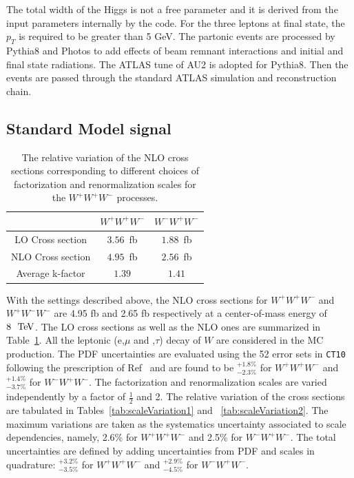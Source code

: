 The total width of the Higgs is not a free parameter and it is
derived from the input parameters internally by the code.  For the
three leptons at final state, the $p_T$ is required to be greater than
5 GeV. The partonic events are processed by {\sc
  Pythia8}\cite{Sjostrand:2007gs} and {\sc
  Photos}\cite{Golonka:2005pn} to add effects of beam remnant
interactions and initial and final state radiations. The ATLAS tune of
AU2\cite{ATLAS:2011zja} is adopted for {\sc Pythia8}.  Then the events
are passed through the standard ATLAS simulation and reconstruction
chain.
\subsection{Standard Model signal}

\begin{table}[ht!]
    \centering
\begin{tabular}{c|c|c}
\hline
     			  & $W^+W^+W^-$ & $W^-W^+W^-$ \\
\hline
LO Cross section  & $3.56$~fb   & $1.88$~fb \\
\hline
NLO Cross section & $4.95$~fb   & $2.56$~fb \\
\hline
Average k-factor  & $1.39$      & $1.41$ \\
\hline
\end{tabular}
\caption{The relative variation of the NLO cross sections corresponding to different choices of factorization and renormalization scales for the $W^+W^+W^-$ processes. }
\label{tab:CrossSectionsSMLONLO}
\end{table}

With the settings described above, the NLO cross sections for
$W^+W^+W^-$ and $W^+W^-W^-$ are 4.95 fb and 2.65 fb respectively at a center-of-mass energy of $8~\TeV$. The LO cross sections as well as the NLO ones are summarized in Table~\ref{tab:CrossSectionsSMLONLO}. 
All the leptonic (e,$\mu$ and ,$\tau$) decay of $W$ are considered in the MC production.
The PDF uncertainties are evaluated using the 52 error sets in
\texttt{CT10} following the prescription of Ref~\cite{Lai:2010vv} and
are found to be $^{+1.8\%}_{-2.3\%}$ for $W^+W^+W^-$ and
$^{+1.4\%}_{-3.7\%}$ for $W^-W^+W^-$.  The factorization and
renormalization scales are varied independently by a factor of
$\frac{1}{2}$ and 2. The relative variation of the cross sections are
tabulated in Tables~\ref{tab:scaleVariation1} and
~\ref{tab:scaleVariation2}. The maximum variations are taken as the
systematics uncertainty associated to scale dependencies, namely, 2.6\%
for $W^+W^+W^-$ and 2.5\% for $W^-W^+W^-$. The total uncertainties are
defined by adding uncertainties from PDF and scales in quadrature:
$^{+3.2\%}_{-3.5\%}$ for $W^+W^+W^-$ and $^{+2.9\%}_{-4.5\%}$ for
$W^-W^+W^-$.

